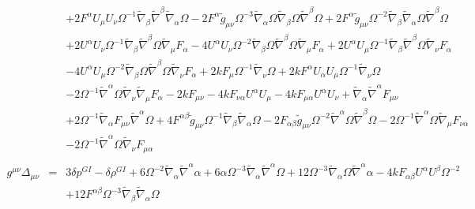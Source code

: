 \documentclass[10pt,letterpaper]{article}
\numberwithin{equation}{section}
\begin{document}
\begin{eqnarray}
&& + 2 F^{\alpha } U_{\mu } U_{\nu } \Omega^{-1} \tilde{\nabla}_{\beta }\tilde{\nabla}^{\beta }\tilde{\nabla}_{\alpha }\Omega - 2 F^{\alpha } \tilde{g}_{\mu \nu } \Omega^{-3} \tilde{\nabla}_{\alpha }\Omega \tilde{\nabla}_{\beta }\Omega \tilde{\nabla}^{\beta }\Omega + 2 F^{\alpha } \tilde{g}_{\mu \nu } \Omega^{-2} \tilde{\nabla}_{\beta }\tilde{\nabla}_{\alpha }\Omega \tilde{\nabla}^{\beta }\Omega \nonumber \\ 
&& + 2 U^{\alpha } U_{\nu } \Omega^{-1} \tilde{\nabla}_{\beta }\tilde{\nabla}^{\beta }\Omega \tilde{\nabla}_{\mu }F_{\alpha } - 4 U^{\alpha } U_{\nu } \Omega^{-2} \tilde{\nabla}_{\beta }\Omega \tilde{\nabla}^{\beta }\Omega \tilde{\nabla}_{\mu }F_{\alpha } + 2 U^{\alpha } U_{\mu } \Omega^{-1} \tilde{\nabla}_{\beta }\tilde{\nabla}^{\beta }\Omega \tilde{\nabla}_{\nu }F_{\alpha } \nonumber \\ 
&& - 4 U^{\alpha } U_{\mu } \Omega^{-2} \tilde{\nabla}_{\beta }\Omega \tilde{\nabla}^{\beta }\Omega \tilde{\nabla}_{\nu }F_{\alpha } + 2 k F_{\mu } \Omega^{-1} \tilde{\nabla}_{\nu }\Omega + 2 k F^{\alpha } U_{\alpha } U_{\mu } \Omega^{-1} \tilde{\nabla}_{\nu }\Omega \nonumber \\ 
&& - 2 \Omega^{-1} \tilde{\nabla}^{\alpha }\Omega \tilde{\nabla}_{\nu }\tilde{\nabla}_{\mu }F_{\alpha }-2 k F_{\mu \nu } - 4 k F_{\nu \alpha } U^{\alpha } U_{\mu } - 4 k F_{\mu \alpha } U^{\alpha } U_{\nu } + \tilde{\nabla}_{\alpha }\tilde{\nabla}^{\alpha }F_{\mu \nu } \nonumber \\ 
&& + 2 \Omega^{-1} \tilde{\nabla}_{\alpha }F_{\mu \nu } \tilde{\nabla}^{\alpha }\Omega + 4 F^{\alpha \beta } \tilde{g}_{\mu \nu } \Omega^{-1} \tilde{\nabla}_{\beta }\tilde{\nabla}_{\alpha }\Omega - 2 F_{\alpha \beta } \tilde{g}_{\mu \nu } \Omega^{-2} \tilde{\nabla}^{\alpha }\Omega \tilde{\nabla}^{\beta }\Omega - 2 \Omega^{-1} \tilde{\nabla}^{\alpha }\Omega \tilde{\nabla}_{\mu }F_{\nu \alpha } \nonumber \\ 
&& - 2 \Omega^{-1} \tilde{\nabla}^{\alpha }\Omega \tilde{\nabla}_{\nu }F_{\mu \alpha }
\\  \nonumber\\ 
g^{\mu\nu}\Delta_{\mu\nu}&=& 3 \delta p^{GI}{} -  \delta \rho^{GI}{} + 6 \Omega^{-2} \tilde{\nabla}_{\alpha }\tilde{\nabla}^{\alpha }\alpha + 6 \alpha \Omega^{-3} \tilde{\nabla}_{\alpha }\tilde{\nabla}^{\alpha }\Omega + 12 \Omega^{-3} \tilde{\nabla}_{\alpha }\Omega \tilde{\nabla}^{\alpha }\alpha -4 k F_{\alpha \beta } U^{\alpha } U^{\beta } \Omega^{-2} \nonumber \\ 
&& + 12 F^{\alpha \beta } \Omega^{-3} \tilde{\nabla}_{\beta }\tilde{\nabla}_{\alpha }\Omega 
\end{eqnarray}
%
%
\end{document}
